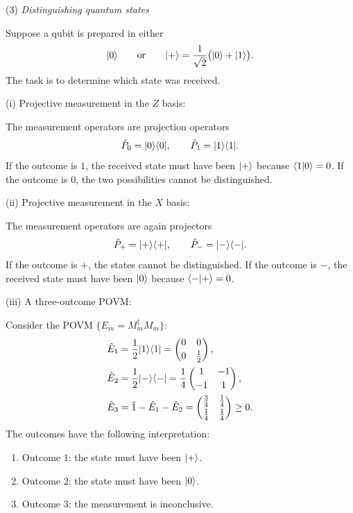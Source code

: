 (3) \emph{Distinguishing quantum states}

Suppose a qubit is prepared in either
\[
  |{0}\rangle
  \qquad\text{or}\qquad
  |{+}\rangle=\frac{1}{\sqrt{2}}\bigl(|{0}\rangle+|{1}\rangle\bigr).
\]
The task is to determine which state was received.

(i) {Projective measurement in the $Z$ basis}:

The measurement operators are projection operators
\[
  \hat P_0=|0\rangle\langle0|,
  \qquad
  \hat P_1=|1\rangle\langle1|.
\]
If the outcome is $1$, the received state must have been $|{+}\rangle$ because
$\langle{1|0}\rangle=0$.  If the outcome is $0$, the two possibilities cannot be
distinguished.

(ii) {Projective measurement in the $X$ basis}:

The measurement operators are again projectors
\[
  \hat P_+=|+\rangle\langle+|,
  \qquad
  \hat P_-=|-\rangle\langle-|.
\]
If the outcome is $+$, the states cannot be distinguished.  If the outcome
is $-$, the received state must have been $|{0}\rangle$ because
$\langle{-|+}\rangle=0$.

(iii) {A three-outcome POVM}:

Consider the POVM $\{E_m=M_m^\dagger M_m\}$:
\begin{align*}
  \hat E_1&=\frac{1}{2}|1\rangle\langle1|
  =\begin{pmatrix}0&0\\[2pt]0&\tfrac12\end{pmatrix},\\
  \hat E_2&=\frac{1}{2}|-\rangle\langle-|
  =\frac14\begin{pmatrix}1&-1\\[2pt]-1&1\end{pmatrix},\\
  \hat E_3&=\hat1-\hat E_1-\hat E_2
  =\begin{pmatrix}\tfrac34&\tfrac14\\[2pt]\tfrac14&\tfrac14\end{pmatrix}
  \ge 0.
\end{align*}
The outcomes have the following interpretation:
\begin{enumerate}[label=\arabic*.]
  \item Outcome $1$: the state must have been $|{+}\rangle$.
  \item Outcome $2$: the state must have been $|{0}\rangle$.
  \item Outcome $3$: the measurement is inconclusive.
\end{enumerate}




